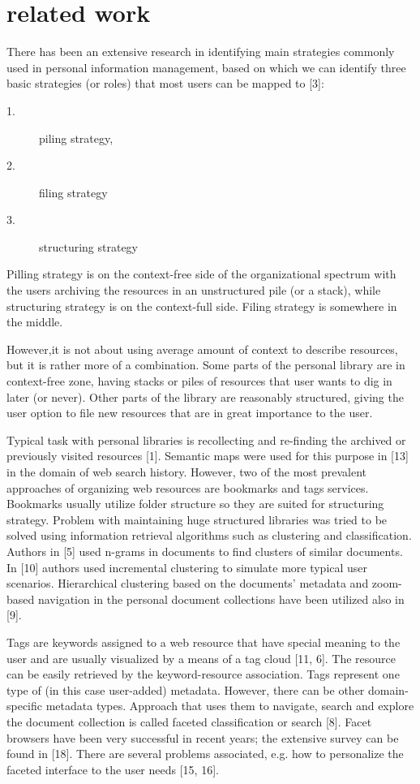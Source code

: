 \documentclass{article}
\begin{document}
\section{related work}

There has been an extensive research in identifying main strategies commonly used in personal information management, based on which we can identify three basic strategies (or roles) that most users can be mapped to [3]: 

\begin{description}
\item [1.]piling strategy,
\item[2.]filing strategy
\item[3.]structuring strategy
\end{description}
Pilling strategy is on the context-free side of the organizational spectrum with the users archiving the resources in an unstructured pile (or a stack), while structuring strategy is on the context-full side. Filing strategy is somewhere in the middle.

 However,it is not about using average amount of context to describe resources, but it is rather more of a combination. Some parts of the personal library are in context-free zone, having stacks or piles of resources that user wants to dig in later (or never). Other parts of the library are reasonably structured, giving the user option to file new resources that are in great importance to the user.
 
  Typical task with personal libraries is recollecting and re-finding the archived or previously visited resources [1]. Semantic maps were used for this purpose in [13] in the domain of web search history. However, two of the most prevalent approaches of organizing web resources are bookmarks and tags services. Bookmarks usually utilize folder structure so they are suited for structuring strategy. Problem with maintaining huge structured libraries was tried to be solved using information retrieval algorithms such as clustering and classification. Authors in [5] used n-grams in documents to find clusters of similar documents. In [10] authors used incremental clustering to simulate more typical user scenarios. Hierarchical clustering based on the documents’ metadata and zoom-based navigation in the personal document collections have been utilized also in [9]. 
  
  Tags are keywords assigned to a web resource that have special meaning to the user and are usually visualized by a means of a tag cloud [11, 6]. The resource can be easily retrieved by the keyword-resource association. Tags represent one type of (in this case user-added) metadata. However, there can be other domain-specific metadata types.  Approach that uses them to navigate, search and explore the document collection is called faceted classification or search [8]. Facet browsers have been very successful in recent years; the extensive survey can be found in [18]. There are several problems associated, e.g. how to personalize the faceted interface to the user needs [15, 16]. 
  
\end{document}
